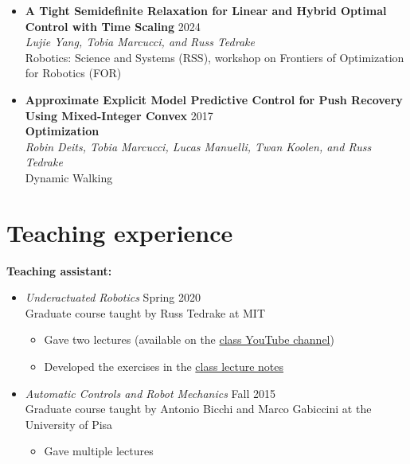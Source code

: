 \documentclass[11pt,a4paper,sans]{moderncv}
\begin{document}
\begin{itemize}
	
\item \textbf{A Tight Semidefinite Relaxation for Linear and Hybrid Optimal Control with Time Scaling} \hfill 2024 \\
\textit{Lujie Yang, Tobia Marcucci, and Russ Tedrake} \\
Robotics: Science and Systems (RSS), workshop on Frontiers of Optimization for Robotics (FOR)


\item \textbf{Approximate Explicit Model Predictive Control for Push Recovery Using Mixed-Integer Convex} \hfill 2017 \\
\textbf{Optimization} \\
\textit{Robin Deits, Tobia Marcucci, Lucas Manuelli, Twan Koolen, and Russ Tedrake} \\
Dynamic Walking

\end{itemize}

\section{Teaching experience}

\vspace{5pt}

\textbf{Teaching assistant:}

\vspace{5pt}

\begin{itemize}

\item \textit{Underactuated  Robotics} \hfill Spring 2020 \\
Graduate course taught by Russ Tedrake at MIT
\begin{itemize}
\item
Gave two lectures (available on the  \href{https://www.youtube.com/playlist?list=PLkx8KyIQkMfX1WpWYqtep7TOmboZeDtev}{\color{cyan}class YouTube channel})
\item
Developed the exercises in the \href{http://underactuated.csail.mit.edu}{\color{cyan}class lecture notes}
\end{itemize}

\item \textit{Automatic Controls and Robot Mechanics} \hfill Fall 2015 \\
Graduate course taught by Antonio Bicchi and Marco Gabiccini at the University of Pisa
\begin{itemize}
\item
Gave multiple lectures
\end{itemize}

\end{itemize}
\end{document}
